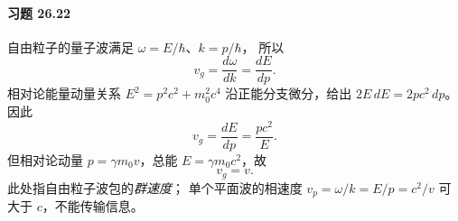 \paragraph{习题 26.22}
自由粒子的量子波满足
\(\omega=E/\hbar\)、\(k=p/\hbar\)，
所以
\[
v_g=\frac{d\omega}{dk}=\frac{dE}{dp}.
\]
相对论能量动量关系
\(E^2=p^2c^2+m_0^2c^4\)
沿正能分支微分，给出
\(2E\,dE=2pc^2\,dp\)。
因此
\[
\boxed{v_g=\frac{dE}{dp}=\frac{pc^2}{E}}.
\]
但相对论动量
\(p=\gamma m_0v\)，总能
\(E=\gamma m_0c^2\)，故
\[
\boxed{v_g=v}.
\]
此处指自由粒子波包的\emph{群速度}；
单个平面波的相速度
\(v_p=\omega/k=E/p=c^2/v\)
可大于 \(c\)，不能传输信息。
